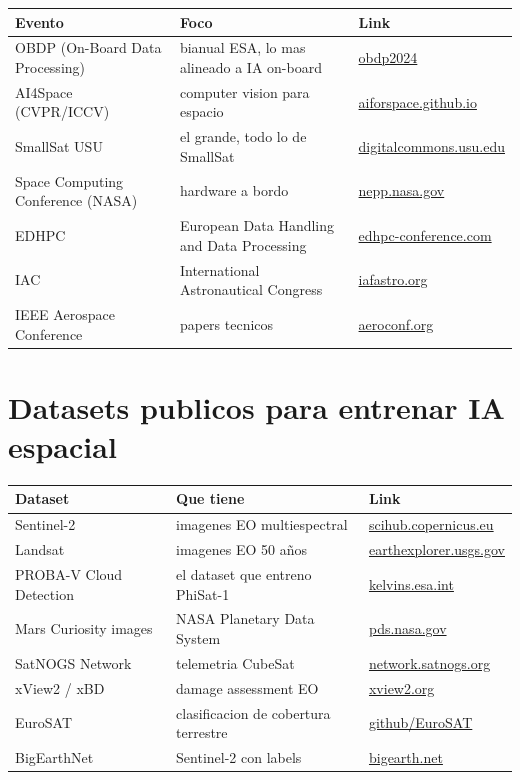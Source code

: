 \documentclass[11pt,a4paper,oneside]{report}
\begin{document}
\begin{longtable}{p{4.5cm}p{6cm}p{4cm}}
\toprule
\textbf{Evento} & \textbf{Foco} & \textbf{Link} \\
\midrule
\endhead
OBDP (On-Board Data Processing) & bianual ESA, lo mas alineado a IA on-board & \href{https://obdp2024.sciencesconf.org}{obdp2024} \\
AI4Space (CVPR/ICCV)          & computer vision para espacio & \href{https://aiforspace.github.io}{aiforspace.github.io} \\
SmallSat USU                  & el grande, todo lo de SmallSat & \href{https://digitalcommons.usu.edu/smallsat}{digitalcommons.usu.edu} \\
Space Computing Conference (NASA) & hardware a bordo & \href{https://nepp.nasa.gov}{nepp.nasa.gov} \\
EDHPC                         & European Data Handling and Data Processing & \href{https://www.edhpc-conference.com}{edhpc-conference.com} \\
IAC                           & International Astronautical Congress & \href{https://www.iafastro.org}{iafastro.org} \\
IEEE Aerospace Conference     & papers tecnicos & \href{https://www.aeroconf.org}{aeroconf.org} \\
\bottomrule
\end{longtable}

\chapter{Datasets publicos para entrenar IA espacial}

\begin{longtable}{p{4cm}p{6cm}p{5cm}}
\toprule
\textbf{Dataset} & \textbf{Que tiene} & \textbf{Link} \\
\midrule
\endhead
Sentinel-2                  & imagenes EO multiespectral & \href{https://scihub.copernicus.eu}{scihub.copernicus.eu} \\
Landsat                     & imagenes EO 50 años & \href{https://earthexplorer.usgs.gov}{earthexplorer.usgs.gov} \\
PROBA-V Cloud Detection     & el dataset que entreno PhiSat-1 & \href{https://kelvins.esa.int/proba-v-super-resolution/}{kelvins.esa.int} \\
Mars Curiosity images       & NASA Planetary Data System & \href{https://pds.nasa.gov}{pds.nasa.gov} \\
SatNOGS Network             & telemetria CubeSat & \href{https://network.satnogs.org}{network.satnogs.org} \\
xView2 / xBD                & damage assessment EO & \href{https://xview2.org}{xview2.org} \\
EuroSAT                     & clasificacion de cobertura terrestre & \href{https://github.com/phelber/EuroSAT}{github/EuroSAT} \\
BigEarthNet                 & Sentinel-2 con labels & \href{https://bigearth.net}{bigearth.net} \\
\bottomrule
\end{longtable}
\end{document}

